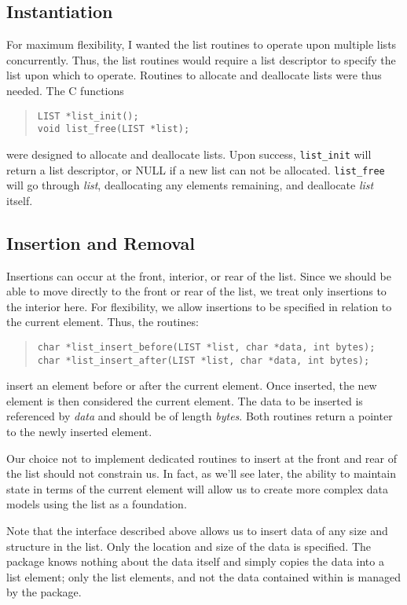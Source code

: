 \subsection{Instantiation}
For maximum flexibility, I wanted the list routines to operate upon multiple
lists concurrently.  Thus, the list routines would require a list descriptor
to specify the list upon which to operate.  Routines to allocate and
deallocate lists were thus needed.  The C functions
\begin{quote}
\begin{verbatim}
LIST *list_init();
void list_free(LIST *list);
\end{verbatim}
\end{quote}
were designed to allocate and deallocate lists.  Upon success,
{\tt list\_init} will return a list descriptor, or NULL if a new list can not
be allocated.  {\tt list\_free} will go through {\em list}, deallocating any
elements remaining,  and deallocate {\em list} itself.

\subsection{Insertion and Removal}
Insertions can occur at the front, interior, or rear of the list.  Since we
should be able to move directly to the front or rear of the list, we treat
only insertions to the interior here.  For flexibility, we allow insertions to
be specified in relation to the current element.  Thus, the routines:
\begin{quote}
\begin{verbatim}
char *list_insert_before(LIST *list, char *data, int bytes);
char *list_insert_after(LIST *list, char *data, int bytes);
\end{verbatim}
\end{quote}
insert an element before or after the current element.  Once inserted, the new
element is then considered the current element.  The data to be inserted is
referenced by {\em data} and should be of length {\em bytes}.  Both routines
return a pointer to the newly inserted element.

Our choice not to implement dedicated routines to insert at the front and rear
of the list should not constrain us.  In fact, as we'll see later, the ability
to maintain state in terms of the current element will allow us to create more
complex data models using the list as a foundation.

Note that the interface described above allows us to insert data of any size
and structure in the list.  Only the location and size of the data is
specified.  The package knows nothing about the data itself and simply copies
the data into a list element; only the list elements, and not the data
contained within is managed by the package.

